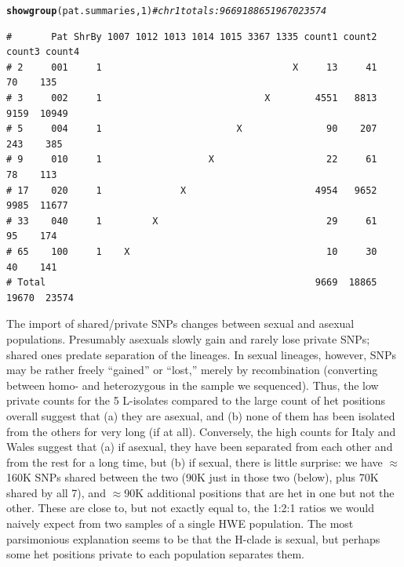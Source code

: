 \documentclass{article}\usepackage[]{graphicx}\usepackage[]{color}
\makeatletter
\newcommand{\hlnum}[1]{\textcolor[rgb]{0.686,0.059,0.569}{#1}}%
\newcommand{\hlcom}[1]{\textcolor[rgb]{0.678,0.584,0.686}{\textit{#1}}}%
\newcommand{\hlstd}[1]{\textcolor[rgb]{0.345,0.345,0.345}{#1}}%
\newcommand{\hlkwd}[1]{\textcolor[rgb]{0.737,0.353,0.396}{\textbf{#1}}}%
\newenvironment{kframe}{%
 \def\at@end@of@kframe{}%
 \ifinner\ifhmode%
  \def\at@end@of@kframe{\end{minipage}}%
  \begin{minipage}{\columnwidth}%
 \fi\fi%
 \def\FrameCommand##1{\hskip\@totalleftmargin \hskip-\fboxsep
 \colorbox{shadecolor}{##1}\hskip-\fboxsep
     \hskip-\linewidth \hskip-\@totalleftmargin \hskip\columnwidth}%
 \MakeFramed {\advance\hsize-\width
   \@totalleftmargin\z@ \linewidth\hsize
   \@setminipage}}%
 {\par\unskip\endMakeFramed%
 \at@end@of@kframe}
\newenvironment{knitrout}{}{} %
\makeatother
\begin{document}
\begin{knitrout}\footnotesize
{}\color{fgcolor}\begin{kframe}
\begin{alltt}
\hlkwd{showgroup}\hlstd{(pat.summaries,}\hlnum{1}\hlstd{)}  \hlcom{# chr1 totals: 9669  18865  19670  23574}
\end{alltt}
\begin{verbatim}
#       Pat ShrBy 1007 1012 1013 1014 1015 3367 1335 count1 count2 count3 count4
# 2     001     1                                  X     13     41     70    135
# 3     002     1                             X        4551   8813   9159  10949
# 5     004     1                        X               90    207    243    385
# 9     010     1                   X                    22     61     78    113
# 17    020     1              X                       4954   9652   9985  11677
# 33    040     1         X                              29     61     95    174
# 65    100     1    X                                   10     30     40    141
# Total                                                9669  18865  19670  23574
\end{verbatim}
\end{kframe}
\end{knitrout}

The import of shared/private SNPs changes between sexual and asexual populations.  Presumably asexuals 
slowly gain and rarely lose private SNPs; shared ones predate separation of the lineages.  In sexual 
lineages, however, SNPs may be rather freely ``gained'' or ``lost,'' merely by recombination (converting 
between homo- and heterozygous in the sample we sequenced). Thus, the low private counts for the 5 
L-isolates compared to the large count of het positions overall suggest that (a) they are asexual, 
and (b) none of them has been isolated from the others for very long (if at all).  Conversely, the 
high counts for Italy and Wales suggest that (a) if asexual, they have been separated from each other 
and from the rest for a long time, but (b) if sexual, there is little surprise: we have $\approx$160K 
SNPs shared between the two (90K just in those two (below), plus 70K shared by all 7), and $\approx$90K 
additional positions that are het in one but not the other.  These are close to, but not exactly equal 
to, the 1:2:1 ratios we would naively expect from two samples of a single HWE population.  The most 
parsimonious explanation seems to be that the H-clade is sexual, but perhaps some het positions private 
to each population separates them.
\end{document}
